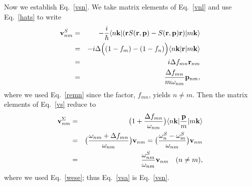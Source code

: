 \documentclass[floatfix,prb,aps,superscriptaddress,11pt]{revtex4}
\begin{document}
Now we establish Eq.~\eqref{vsn}. We take matrix elements of Eq.~\eqref{vnl}
and use Eq.~\eqref{hats} to write 
\begin{eqnarray}
\mathbf{v}_{nm}^{S} &=&-\frac{i}{\hbar }\langle n\mathbf{k}|(\mathbf{r} S(\mathbf{r},\mathbf{p})-S(\mathbf{r},\mathbf{p})
\mathbf{r})|m\mathbf{k}\rangle  \notag  \label{vnla} \\
&=&-i\Delta\Big((1-f_{m})-(1-f_{n})\Big)\langle n\mathbf{k}|\mathbf{r}|m\mathbf{k}\rangle  \notag \\
&=&i\Delta f_{mn}\mathbf{r}_{nm}  \notag \\
&=&\frac{\Delta f_{mn}}{m\omega_{nm}}\mathbf{p}_{nm},
\end{eqnarray}
where we used Eq.~\eqref{remn} since the factor, $f_{mn}$, yields $%
n\neq m$. Then the matrix elements of Eq.~\eqref{vs} reduce to 
\begin{eqnarray}
\mathbf{v}_{nm}^{\Sigma} &=&\big(1+\frac{\Delta f_{mn}}{\omega_{nm}}\big)\langle n\mathbf{k}|\frac{%
\mathbf{p}}{m}|m\mathbf{k}\rangle  \notag  \label{vsa} \\
&=&\big(\frac{\omega_{nm}+\Delta f_{mn}}{\omega_{nm}}\big)\mathbf{v}_{nm}=\big(\frac{\omega%
_{n}^{S}-\omega_{m}^{S}}{\omega_{nm}}\big)\mathbf{v}_{nm}  \notag \\
&=&\frac{\omega_{nm}^{S}}{\omega_{nm}}\mathbf{v}_{nm}\quad(n\neq m),
\end{eqnarray}
where we used Eq.~\eqref{wese}; thus Eq.~\eqref{vsa} is Eq.~\eqref{vsn}.
\end{document}
